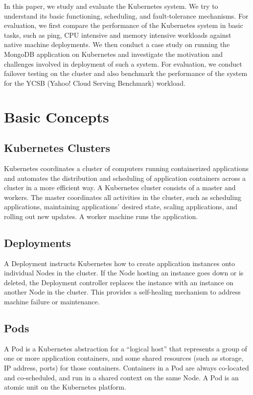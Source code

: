 \documentclass[sigconf]{acmart}
\begin{document}
In this paper, we study and evaluate the Kubernetes system. We try to understand its basic functioning, scheduling, and fault-tolerance mechanisms. For evaluation, we first compare the performance of the Kubernetes system in basic tasks, such as ping, CPU intensive and memory intensive workloads against native machine deployments. We then conduct a case study on running the MongoDB application on Kubernetes and investigate the motivation and challenges involved in deployment of such a system. For evaluation, we conduct failover testing on the cluster and also benchmark the performance of the system for the YCSB (Yahoo! Cloud Serving Benchmark) workload.


\section{Basic Concepts}

\subsection{Kubernetes Clusters}
Kubernetes coordinates a cluster of computers running containerized applications and automates the distribution and scheduling of application containers across a cluster in a more efficient way. A Kubernetes cluster consists of a master and workers. The master coordinates all activities in the cluster, such as scheduling applications, maintaining applications' desired state, scaling applications, and rolling out new updates. A worker machine runs the application.

\subsection{Deployments}
A Deployment instructs Kubernetes how to create application instances onto individual Nodes in the cluster.  If the Node hosting an instance goes down or is deleted, the Deployment controller replaces the instance with an instance on another Node in the cluster. This provides a self-healing mechanism to address machine failure or maintenance.

\subsection{Pods}
A Pod is a Kubernetes abstraction for a “logical host” that represents a group of one or more application containers, and some shared resources (such as storage, IP address, ports) for those containers. Containers in a Pod are always co-located and co-scheduled, and run in a shared context on the same Node. A Pod is an atomic unit on the Kubernetes platform.
\end{document}
